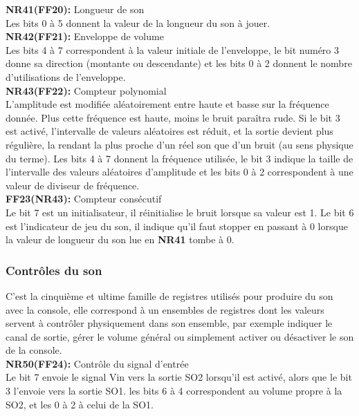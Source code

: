 \documentclass[french]{report}
\begin{document}
	\textbf{NR41(FF20):} Longueur de son \\
		Les bits 0 à 5 donnent la valeur de la longueur du son
		à jouer.\\

	\textbf{NR42(FF21):} Enveloppe de volume\\
		Les bits 4 à 7 correspondent à la valeur initiale de
		l'enveloppe, le bit numéro 3 donne sa direction
		(montante ou descendante) et les bits 0 à 2 donnent le
		nombre d'utilisations de l'enveloppe.\\

	\textbf{NR43(FF22):} Compteur polynomial \\
		L'amplitude est modifiée aléatoirement entre haute et
		basse sur la fréquence donnée. Plus cette fréquence
		est haute, moins le bruit paraîtra rude. 
		Si le bit 3 est activé, l'intervalle de valeurs
		aléatoires est réduit, et la sortie devient plus
		régulière, la rendant la plus proche d'un réel
		son que d'un bruit (au sens physique du terme).
		Les bits 4 à 7 donnent la fréquence utilisée, le bit 3
		indique la taille de l'intervalle des valeurs
		aléatoires d'amplitude et les bits 0 à 2 correspondent
		à une valeur de diviseur de fréquence.\\ 

	\textbf{FF23(NR43):} Compteur consécutif\\
		Le bit 7 est un initialisateur, il réinitialise le bruit
		lorsque sa valeur est 1.
		Le bit 6 est l'indicateur de jeu du son, il indique
		qu'il faut stopper en passant à 0 lorsque la valeur de
		longueur du son lue en \textbf{NR41} tombe à 0. 
	\subsubsection{Contrôles du son}
		C'est la cinquième et ultime famille de registres
		utilisés pour produire du son avec la console, elle
		correspond à un ensembles de registres dont les
		valeurs servent à contrôler physiquement dans son
		ensemble, par exemple indiquer le canal de sortie,
		gérer le volume général ou simplement activer ou
		désactiver le son de la console. \\

	\textbf{NR50(FF24):} Contrôle du signal d'entrée \\ 
		Le bit 7 envoie le signal Vin vers la sortie SO2
		lorsqu'il est activé, alors que le bit 3 l'envoie vers
		la sortie SO1. les bits 6 à 4 correspondent au volume
		propre à la SO2, et les 0 à 2 à celui de la SO1. \\
\end{document}
